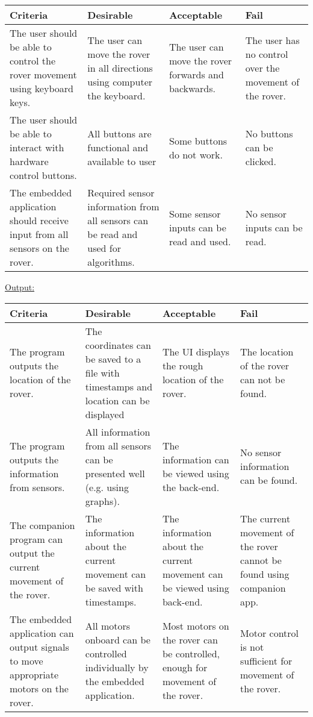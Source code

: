 \documentclass[11pt]{report}
\begin{document}
		\noindent
		\begin{tabularx}{\textwidth}{|X|X|X|X|}
			\hline
			\textbf{Criteria}     & \textbf{Desirable}    & \textbf{Acceptable} &  \textbf{Fail}	 \\ \hline
			The user should be able to control the rover movement using keyboard keys.      &  The user can move the rover in all directions using computer the keyboard.  & The user can move the rover forwards and backwards. & The user has no control over the movement of the rover.      \\ \hline
			The user should be able to interact with hardware control buttons.        & All buttons are functional and available to user	&	Some buttons do not work.	&  No buttons can be clicked.       \\ \hline
			The embedded application should receive input from all sensors on the rover.        & Required sensor information from all sensors can be read and used for algorithms.	&	Some sensor inputs can be read and used.	& No sensor inputs can be read.       \\ \hline
		\end{tabularx}
		\newpage
	
		\underline{Output:} \\
	
		\noindent
		\begin{tabularx}{\textwidth}{|X|X|X|X|}
			\hline
			\textbf{Criteria}     & \textbf{Desirable}    & \textbf{Acceptable} &  \textbf{Fail}	 \\ \hline
			 The program outputs the location of the rover.     & The coordinates can be saved to a file with timestamps and location can be displayed  &  The UI displays the rough location of the rover. & The location of the rover can not be found.     \\ \hline
			 The program outputs the information from sensors.       &  All information from all sensors can be presented well (e.g. using graphs).	&	The information can be viewed using the back-end.	&   No sensor information can be found.     \\ \hline
			 The companion program can output the current movement of the rover.        &  The information about the current movement can be saved with timestamps.	&	The information about the current movement can be viewed using back-end.	&  The current movement of the rover cannot be found using companion app.      \\ \hline
			 The embedded application can output signals to move appropriate motors on the rover.       & All motors onboard can be controlled individually by the embedded application.	&	Most motors on the rover can be controlled, enough for movement of the rover.	&   Motor control is not sufficient for movement of the rover.     \\ \hline
		\end{tabularx}
		~\\
\end{document}

